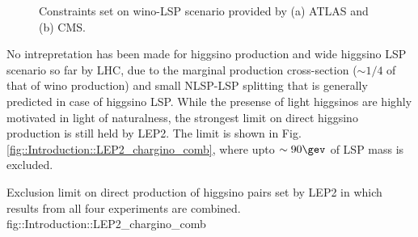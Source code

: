 \begin{figure}[h]
  \centering
    \caption{Constraints set on wino-LSP scenario provided by (a) ATLAS and  (b) CMS.}
    \label{fig::Introduction::LHCLimitWino}
\end{figure}

No intrepretation has been made for higgsino production and wide higgsino LSP scenario so far by LHC, 
due to the marginal production cross-section ($\sim 1/4$ of that of wino production) and small NLSP-LSP splitting that is generally predicted in case of higgsino LSP.
While the presense of light higgsinos are highly motivated in light of naturalness, 
the strongest limit on direct higgsino production is still held by LEP2.
The limit is shown in Fig. \ref{fig::Introduction::LEP2_chargino_comb}, where upto $\sim 90\gev$ of LSP mass is excluded.

{Exclusion limit on direct production of higgsino pairs set by LEP2 in which results from all four experiments are combined.}
{fig::Introduction::LEP2_chargino_comb}


